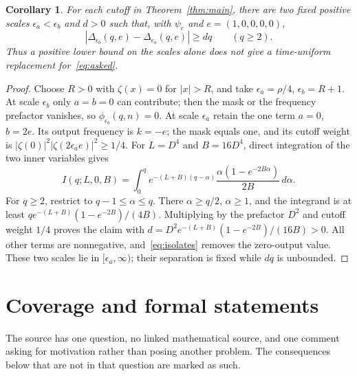 \documentclass[11pt]{article}
\newtheorem{corollary}[theorem]{Corollary}
\begin{document}
\begin{corollary}\label{cor:time}
For each cutoff in Theorem~\ref{thm:main}, there are two fixed positive
scales $\epsilon_a<\epsilon_b$ and $d>0$ such that, with
$\psi_e$ and $e=(1,0,0,0,0)$,
\[
 |\Delta_{\epsilon_b}(q,e)-\Delta_{\epsilon_a}(q,e)|\ge dq
 \qquad(q\ge2).
\]
Thus a positive lower bound on the scales alone does not give a
time-uniform replacement for~\eqref{eq:asked}.
\end{corollary}
\begin{proof}
Choose $R>0$ with $\zeta(x)=0$ for $|x|>R$, and take
$\epsilon_a=\rho/4$, $\epsilon_b=R+1$.
At scale $\epsilon_b$ only $a=b=0$ can contribute; then the
mask or the frequency prefactor vanishes, so $\phi_{\epsilon_b}(q,n)=0$.
At scale $\epsilon_a$ retain the one term $a=0$, $b=2e$.
Its output frequency is $k=-e$; the mask equals one, and its cutoff
weight is $|\zeta(0)|^2|\zeta(2\epsilon_a e)|^2\ge1/4$.
For $L=D^4$ and $B=16D^4$, direct integration of the two inner
variables gives
\[
 I(q;L,0,B)=\int_0^q e^{-(L+B)(q-\alpha)}
             \frac{\alpha(1-e^{-2B\alpha})}{2B}\,d\alpha.
\]
For $q\ge2$, restrict to $q-1\le\alpha\le q$. There
$\alpha\ge q/2$, $\alpha\ge1$, and the integrand is at least
$q e^{-(L+B)}(1-e^{-2B})/(4B)$.
Multiplying by the prefactor $D^2$ and cutoff weight $1/4$ proves
the claim with $d=D^2e^{-(L+B)}(1-e^{-2B})/(16B)>0$.
All other terms are nonnegative, and~\eqref{eq:isolates} removes
the zero-output value. These two scales lie in $[\epsilon_a,\infty)$;
their separation is fixed while $dq$ is unbounded.
\end{proof}

\section{Coverage and formal statements}

The source has one question, no linked mathematical source, and one
comment asking for motivation rather than posing another problem.
The consequences below that are not in that question are marked as such.
\end{document}
